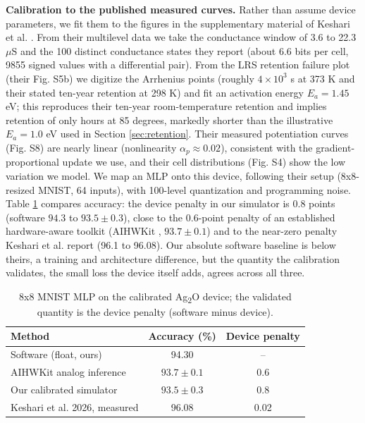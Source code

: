 \documentclass[conference]{IEEEtran}
\begin{document}
\textbf{Calibration to the published measured curves.} Rather than assume device
parameters, we fit them to the figures in the supplementary material of Keshari
et al. \cite{keshari2026}. From their multilevel data we take the conductance
window of 3.6 to 22.3 $\mu$S and the 100 distinct conductance states they report
(about 6.6 bits per cell, 9855 signed values with a differential pair). From the
LRS retention failure plot (their Fig. S5b) we digitize the Arrhenius points
(roughly $4\times10^3$ s at 373 K and their stated ten-year retention at 298 K)
and fit an activation energy $E_a = 1.45$ eV; this reproduces their ten-year
room-temperature retention and implies retention of only hours at 85 degrees,
markedly shorter than the illustrative $E_a=1.0$ eV used in Section
\ref{sec:retention}. Their measured potentiation curves (Fig. S8) are nearly
linear (nonlinearity $\alpha_p \approx 0.02$), consistent with the
gradient-proportional update we use, and their cell distributions (Fig. S4) show
the low variation we model. We map an MLP onto this device, following their setup
(8x8-resized MNIST, 64 inputs), with 100-level quantization and programming
noise. Table \ref{tab:mnist} compares accuracy: the device penalty in our
simulator is $0.8$ points (software $94.3$ to $93.5 \pm 0.3$), close to the
$0.6$-point penalty of an established hardware-aware toolkit (AIHWKit
\cite{rasch2023}, $93.7 \pm 0.1$) and to the near-zero penalty Keshari et al.
report (96.1 to 96.08). Our absolute software baseline is below theirs, a
training and architecture difference, but the quantity the calibration validates,
the small loss the device itself adds, agrees across all three.

\begin{table}[t]
\caption{8x8 MNIST MLP on the calibrated Ag\textsubscript{2}O device; the
validated quantity is the device penalty (software minus device).}
\label{tab:mnist}
\centering
\begin{tabular}{lcc}
\toprule
Method & Accuracy (\%) & Device penalty \\
\midrule
Software (float, ours) & 94.30 & -- \\
AIHWKit analog inference \cite{rasch2023} & $93.7 \pm 0.1$ & 0.6 \\
Our calibrated simulator & $93.5 \pm 0.3$ & 0.8 \\
Keshari et al. 2026, measured \cite{keshari2026} & 96.08 & 0.02 \\
\bottomrule
\end{tabular}
\end{table}
\end{document}
